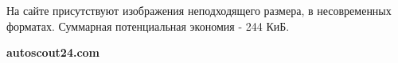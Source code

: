 \noindent
\begin{minipage}{\linewidth}
\end{minipage}
\bigskip

На сайте присутствуют изображения неподходящего размера, в несовременных форматах. Суммарная потенциальная экономия - 244 КиБ.

\textbf{autoscout24.com}
\bigskip

\noindent
\begin{minipage}{\linewidth}
\end{minipage}
\bigskip

